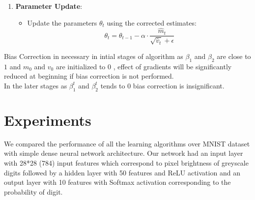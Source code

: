 \documentclass{article}
\begin{document}
\begin{itemize}
\begin{enumerate}
        \item \textbf{Parameter Update}:
        \begin{itemize}
            \item Update the parameters $\theta_t$ using the corrected estimates:
            \[
            \theta_t = \theta_{t-1} - \alpha \cdot \frac{\hat{m}_t}{\sqrt{\hat{v}_t} + \epsilon}
            \]
        \end{itemize}

    \end{enumerate}
\end{itemize}


Bias Correction in necessary in intial stages of algorithm as $\beta_1$ and $\beta_2$ are close to $1$ and $m_0$ and $v_0$ are initialized to 0 , effect of gradients will be significantly reduced at beginning if bias correction is not performed. \\
In the later stages as $\beta_1^t$ and $\beta_2^t$ tends to 0 bias correction is insignificant. 






\section*{Experiments}
We compared the performance of all the learning algorithms over MNIST dataset with simple dense neural network architecture. Our network had an input layer with 28*28 (784) input features which correspond to pixel brightness of greyscale digits followed by a hidden layer with 50 features and ReLU activation and an output layer with 10 features with Softmax activation corresponding to the probability of digit.
\end{document}
